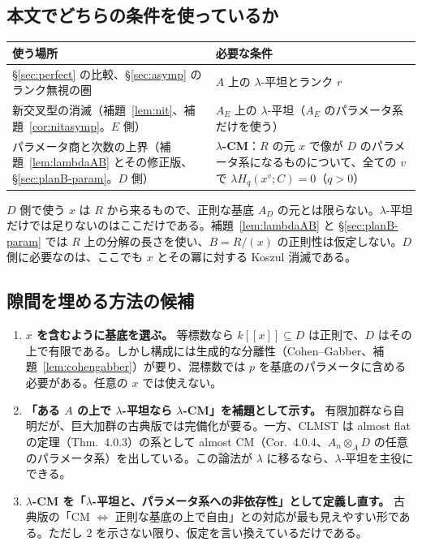 \documentclass[11pt,a4paper]{ltjsarticle}
\numberwithin{equation}{section}
\theoremstyle{plain}
\theoremstyle{definition}
\theoremstyle{definition}
\begin{document}
\subsection{本文でどちらの条件を使っているか}
\begin{center}
\small
\begin{tabularx}{\textwidth}{>{\raggedright}X>{\raggedright\arraybackslash}X}
\toprule
使う場所 & 必要な条件 \\
\midrule
§\ref{sec:perfect} の比較、§\ref{sec:asymp} のランク無視の圏 & $A$ 上の $\lambda$-平坦とランク $r$ \\
新交叉型の消滅（補題~\ref{lem:nit}、補題~\ref{cor:nitasymp}。$E$ 側） & $A_E$ 上の $\lambda$-平坦（$A_E$ のパラメータ系だけを使う） \\
パラメータ商と次数の上界（補題~\ref{lem:lambdaAB} とその修正版、\S\ref{sec:planB-param}。$D$ 側） & \textbf{$\lambda$-CM}：$R$ の元 $x$ で像が $D$ のパラメータ系になるものについて、全ての $v$ で $\lambda H_q(x^v;C)=0$（$q>0$） \\
\bottomrule
\end{tabularx}
\end{center}
$D$ 側で使う $x$ は $R$ から来るもので、正則な基底 $A_D$ の元とは限らない。$\lambda$-平坦だけでは足りないのはここだけである。補題~\ref{lem:lambdaAB} と \S\ref{sec:planB-param} では $R$ 上の分解の長さを使い、$B=R/(x)$ の正則性は仮定しない。$D$ 側に必要なのは、ここでも $x$ とその冪に対する Koszul 消滅である。

\subsection{隙間を埋める方法の候補}
\begin{enumerate}
  \item \textbf{$x$ を含むように基底を選ぶ。} 等標数なら $k[[x]]\subseteq D$ は正則で、$D$ はその上で有限である。しかし構成には生成的な分離性（Cohen--Gabber、補題~\ref{lem:cohengabber}）が要り、混標数では $p$ を基底のパラメータに含める必要がある。任意の $x$ では使えない。
  \item \textbf{「ある $A$ の上で $\lambda$-平坦なら $\lambda$-CM」を補題として示す。} 有限加群なら自明だが、巨大加群の古典版では完備化が要る。一方、CLMST は almost flat の定理（Thm.~4.0.3）の系として almost CM（Cor.~4.0.4、$A_n\otimes_A D$ の任意のパラメータ系）を出している。この論法が $\lambda$ に移るなら、$\lambda$-平坦を主役にできる。
  \item \textbf{$\lambda$-CM を「$\lambda$-平坦と、パラメータ系への非依存性」として定義し直す。} 古典版の「CM $\Leftrightarrow$ 正則な基底の上で自由」との対応が最も見えやすい形である。ただし 2 を示さない限り、仮定を言い換えているだけである。
\end{enumerate}
\end{document}
